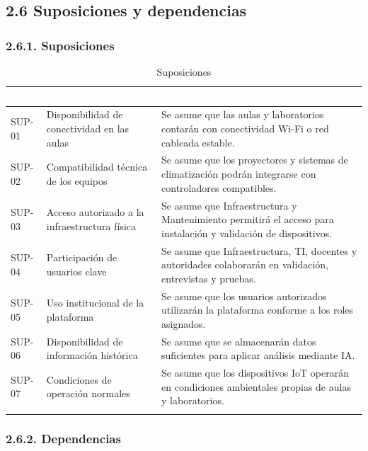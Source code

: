 \subsection*{2.6 Suposiciones y dependencias}


\subsubsection*{2.6.1. Suposiciones}


\begingroup
\small
\begin{longtable}{|p{5.2cm}|p{5.2cm}|p{5.2cm}|}
\hline
\cellcolor{sigagreen}\textcolor{white}{\textbf{ID}} & \cellcolor{sigagreen}\textcolor{white}{\textbf{Suposición}} & \cellcolor{sigagreen}\textcolor{white}{\textbf{Descripción}} \\ \hline
SUP-01 & Disponibilidad de conectividad en las aulas & Se asume que las aulas y laboratorios contarán con conectividad Wi-Fi o red cableada estable. \\ \hline
SUP-02 & Compatibilidad técnica de los equipos & Se asume que los proyectores y sistemas de climatización podrán integrarse con controladores compatibles. \\ \hline
SUP-03 & Acceso autorizado a la infraestructura física & Se asume que Infraestructura y Mantenimiento permitirá el acceso para instalación y validación de dispositivos. \\ \hline
SUP-04 & Participación de usuarios clave & Se asume que Infraestructura, TI, docentes y autoridades colaborarán en validación, entrevistas y pruebas. \\ \hline
SUP-05 & Uso institucional de la plataforma & Se asume que los usuarios autorizados utilizarán la plataforma conforme a los roles asignados. \\ \hline
SUP-06 & Disponibilidad de información histórica & Se asume que se almacenarán datos suficientes para aplicar análisis mediante IA. \\ \hline
SUP-07 & Condiciones de operación normales & Se asume que los dispositivos IoT operarán en condiciones ambientales propias de aulas y laboratorios. \\ \hline
\caption{Suposiciones}
\end{longtable}
\endgroup

\subsubsection*{2.6.2. Dependencias}

